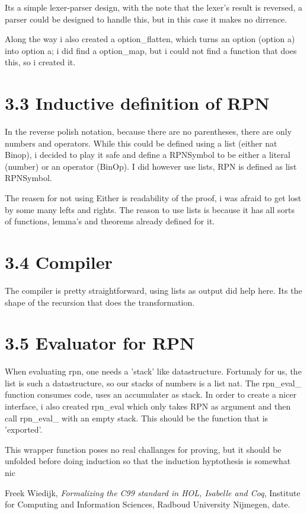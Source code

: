 \documentclass[10pt,a4paper,usenames,dvipnames]{article}
\begin{document}
Its a simple lexer-parser design, with the note that the lexer's result is reversed, a parser could be designed to handle this, but in this case it makes no dirrence.

Along the way i also created a option\_flatten, which turns an option (option a) into option a; i did find a option\_map, but i could not find a function that does this, so i created it.

\section*{3.3 Inductive definition of RPN }

In the reverse polish notation, because there are no parentheses, there are only numbers and operators. While this could be defined using a list (either nat Binop), i decided to play it safe and define a RPNSymbol to be either a literal (number) or an operator (BinOp). I did however use lists, RPN is defined as list RPNSymbol.

The reasen for not using Either is readability of the proof, i was afraid to get lost by some many lefts and rights. The reason to use lists is because it has all sorts of functions, lemma's and theorems already defined for it.

\section*{3.4 Compiler }
The compiler is pretty straightforward, using lists as output did help here. Its the shape of the recursion that does the transformation.

\section*{3.5 Evaluator for RPN}
When evaluating rpn, one needs a 'stack' like datastructure. Fortunaly for us, the list is such a datastructure, so our stacks of numbers is a list nat. The rpn_eval_ function consumes code, uses an accumulater as stack. In order to create a nicer interface, i also created rpn_eval which only takes RPN as argument and then call rpn_eval_ with an empty stack. This should be the function that is 'exported'.

This wrapper function poses no real challanges for proving, but it should be unfolded before doing induction so that the induction hyptothesis is somewhat nic


\begin{thebibliography}{9}

	Freek Wiedijk, 
	\emph{Formalizing the C99 standard in HOL, Isabelle and Coq}, 
	Institute for Computing and Information Sciences, Radboud University Nijmegen, 
	date.

\end{thebibliography}
\end{document}

